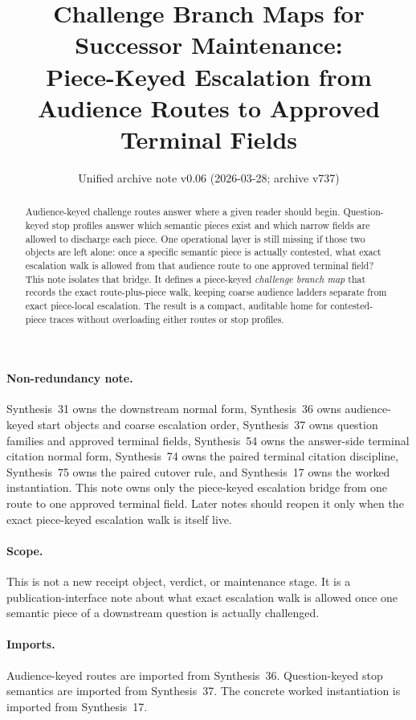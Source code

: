 \documentclass[11pt]{article}
\title{Challenge Branch Maps for Successor Maintenance:\\[0.5ex]
\large Piece-Keyed Escalation from Audience Routes to Approved Terminal Fields}
\author{}
\date{Unified archive note v0.06 (2026-03-28; archive v737)}
\begin{document}
\maketitle

\begin{abstract}
Audience-keyed challenge routes answer where a given reader should begin.
Question-keyed stop profiles answer which semantic pieces exist and which narrow fields are allowed to discharge each piece.
One operational layer is still missing if those two objects are left alone: once a specific semantic piece is actually contested, what exact escalation walk is allowed from that audience route to one approved terminal field?
This note isolates that bridge.
It defines a piece-keyed \emph{challenge branch map} that records the exact route-plus-piece walk, keeping coarse audience ladders separate from exact piece-local escalation.
The result is a compact, auditable home for contested-piece traces without overloading either routes or stop profiles.
\end{abstract}

\paragraph{Non-redundancy note.}
Synthesis~31 owns the downstream normal form, Synthesis~36 owns audience-keyed start objects and coarse escalation order, Synthesis~37 owns question families and approved terminal fields, Synthesis~54 owns the answer-side terminal citation normal form, Synthesis~74 owns the paired terminal citation discipline, Synthesis~75 owns the paired cutover rule, and Synthesis~17 owns the worked instantiation.
This note owns only the piece-keyed escalation bridge from one route to one approved terminal field. Later notes should reopen it only when the exact piece-keyed escalation walk is itself live.

\paragraph{Scope.}
This is not a new receipt object, verdict, or maintenance stage.
It is a publication-interface note about what exact escalation walk is allowed once one semantic piece of a downstream question is actually challenged.

\paragraph{Imports.}
Audience-keyed routes are imported from Synthesis~36.\cite{series:challengeroutes}
Question-keyed stop semantics are imported from Synthesis~37.\cite{series:challengestops}
The concrete worked instantiation is imported from Synthesis~17.\cite{series:workedexample}
\end{document}

